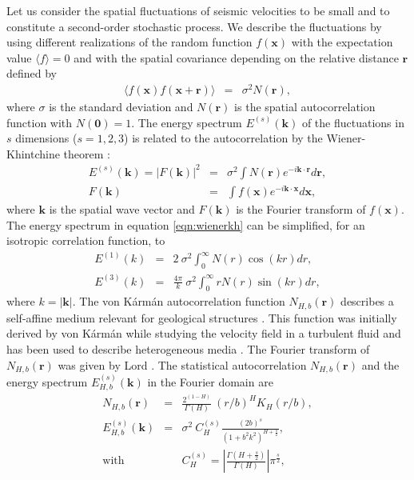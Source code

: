 Let us consider the spatial fluctuations of seismic velocities to be small and to 
constitute a second-order stochastic process.
We describe the fluctuations by using different realizations of the random function $f(\mathbf{x})$
with the expectation value $\langle f \rangle = 0$ and with the spatial covariance 
depending on the relative distance $\mathbf{r}$ defined by
\begin{eqnarray}
\langle f(\mathbf{x})f(\mathbf{x}+\mathbf{r})\rangle & = & \sigma^2 N(\mathbf{r}), \label{eqn:covarf}
\end{eqnarray}
where $\sigma$ is the standard deviation and $N(\mathbf{r})$ is the spatial autocorrelation 
function with $N(\mathbf{0})=1$.
The energy spectrum $E^{(s)}(\mathbf{k})$ of the fluctuations in $s$ dimensions ($s=1,2,3$) is
related to the autocorrelation by the Wiener-Khintchine theorem \cite[]{Born_W64}:
\begin{eqnarray}
E^{(s)}(\mathbf{k}) = |F(\mathbf{k})|^2 & = & 
\sigma^2\int N(\mathbf{r})e^{-i\mathbf{k}\cdot\mathbf{r}}d\mathbf{r}, \label{eqn:wienerkh}\\
F(\mathbf{k}) & = & \int f(\mathbf{x})e^{-i\mathbf{k}\cdot\mathbf{x}}d\mathbf{x},
\end{eqnarray}
where $\mathbf{k}$ is the spatial wave vector and $F(\mathbf{k})$ is the Fourier transform of $f(\mathbf{x})$.
The energy spectrum in equation \ref{eqn:wienerkh} can be simplified, for an isotropic correlation function, to
\begin{eqnarray}
E^{(1)}(k) & = & 2~\sigma^2\int_{0}^{\infty}N(r)\cos(kr)dr, \label{eqn:etf1d}\\
E^{(3)}(k) & = & \frac{4\pi}{k}~\sigma^2\int_{0}^{\infty} rN(r)\sin(kr)dr, \label{eqn:etf3d}
\end{eqnarray}
where $k=|\mathbf{k}|$.
The von K\'arm\'an autocorrelation function $N_{H,b}(\mathbf{r})$ 
describes a self-affine medium relevant for geological structures \cite[]{Goff_J88,Holliger_L92,Dolan_BR98,Sato_F98,Klimes_02,Goff_H03}.
This function was initially derived by von K\'arm\'an  
while studying the velocity field in a turbulent fluid
and has been used to describe heterogeneous media \cite[]{Tatarski_61,Frankel_C86}.
The Fourier transform of $N_{H,b}(\mathbf{r})$ was given by Lord .
The statistical autocorrelation $N_{H,b}(\mathbf{r})$
and the energy spectrum $E^{(s)}_{H,b}(\mathbf{k})$ in the Fourier domain are
\begin{eqnarray}
N_{H,b}(\mathbf{r}) & = & \frac{2^{(1-H)}}{\Gamma(H)}~(r/b)^{H}K_{H}(r/b),\label{eqn:vkacf}\\
E^{(s)}_{H,b}(\mathbf{k}) & = & \sigma^2~C^{(s)}_{H}
\frac{\left(2b\right)^s}{\left(1+b^2k^2\right)^{H+\frac{s}{2}}},\label{eqn:vkes} \\
\mbox{with} & & C^{(s)}_{H}=\left|\frac{\Gamma(H+\frac{s}{2})}{\Gamma(H)}\right|\pi^{\frac{s}{2}}, \label{eqn:calpha}
\end{eqnarray}

